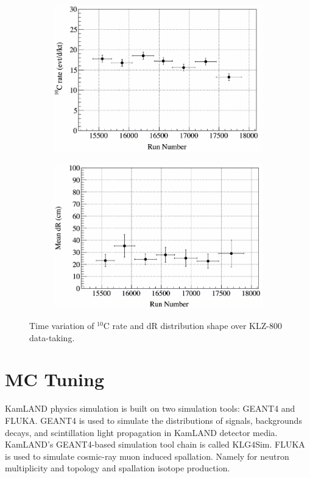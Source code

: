 \begin{figure}[htb]
    \centering
    \begin{subfigure}[b]{0.48\textwidth}
        \centering
        \includegraphics[width=\textwidth]{c10_rate.png}
    \end{subfigure}
    \hfill
    \begin{subfigure}[b]{0.48\textwidth}
        \centering
        \includegraphics[width=\textwidth]{c10_dist.png}
    \end{subfigure}
    
    \caption{Time variation of $^{10}$C rate and dR distribution shape over KLZ-800 data-taking.}
    \label{fig:C10_stability}
\end{figure}

\section{MC Tuning}
KamLAND physics simulation is built on two simulation tools: GEANT4 and FLUKA. GEANT4 is used to simulate the distributions of signals, backgrounds decays, and scintillation light propagation in KamLAND detector media. KamLAND's GEANT4-based simulation tool chain is called KLG4Sim. FLUKA is used to simulate cosmic-ray muon induced spallation. Namely for neutron multiplicity and topology and spallation isotope production. 
